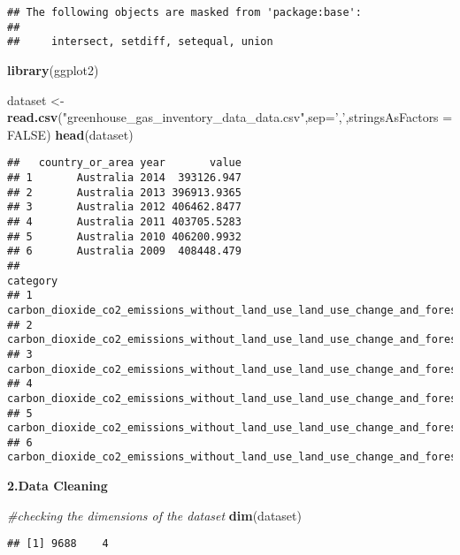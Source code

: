 \documentclass[
]{article}
\newenvironment{Shaded}{\begin{snugshade}}{\end{snugshade}}
\newcommand{\CommentTok}[1]{\textcolor[rgb]{0.56,0.35,0.01}{\textit{#1}}}
\newcommand{\DataTypeTok}[1]{\textcolor[rgb]{0.13,0.29,0.53}{#1}}
\newcommand{\KeywordTok}[1]{\textcolor[rgb]{0.13,0.29,0.53}{\textbf{#1}}}
\newcommand{\NormalTok}[1]{#1}
\newcommand{\OtherTok}[1]{\textcolor[rgb]{0.56,0.35,0.01}{#1}}
\newcommand{\StringTok}[1]{\textcolor[rgb]{0.31,0.60,0.02}{#1}}
\begin{document}
\begin{verbatim}
## The following objects are masked from 'package:base':
## 
##     intersect, setdiff, setequal, union
\end{verbatim}

\begin{Shaded}
\begin{Highlighting}[]
\KeywordTok{library}\NormalTok{(ggplot2)}

\NormalTok{dataset <-}\StringTok{ }\KeywordTok{read.csv}\NormalTok{(}\StringTok{"greenhouse_gas_inventory_data_data.csv"}\NormalTok{,}\DataTypeTok{sep=}\StringTok{','}\NormalTok{,}\DataTypeTok{stringsAsFactors =} \OtherTok{FALSE}\NormalTok{)}
\KeywordTok{head}\NormalTok{(dataset)}
\end{Highlighting}
\end{Shaded}

\begin{verbatim}
##   country_or_area year       value
## 1       Australia 2014  393126.947
## 2       Australia 2013 396913.9365
## 3       Australia 2012 406462.8477
## 4       Australia 2011 403705.5283
## 5       Australia 2010 406200.9932
## 6       Australia 2009  408448.479
##                                                                                                        category
## 1 carbon_dioxide_co2_emissions_without_land_use_land_use_change_and_forestry_lulucf_in_kilotonne_co2_equivalent
## 2 carbon_dioxide_co2_emissions_without_land_use_land_use_change_and_forestry_lulucf_in_kilotonne_co2_equivalent
## 3 carbon_dioxide_co2_emissions_without_land_use_land_use_change_and_forestry_lulucf_in_kilotonne_co2_equivalent
## 4 carbon_dioxide_co2_emissions_without_land_use_land_use_change_and_forestry_lulucf_in_kilotonne_co2_equivalent
## 5 carbon_dioxide_co2_emissions_without_land_use_land_use_change_and_forestry_lulucf_in_kilotonne_co2_equivalent
## 6 carbon_dioxide_co2_emissions_without_land_use_land_use_change_and_forestry_lulucf_in_kilotonne_co2_equivalent
\end{verbatim}

\textbf{2.Data Cleaning}

\begin{Shaded}
\begin{Highlighting}[]
\CommentTok{#checking the dimensions of the dataset}
\KeywordTok{dim}\NormalTok{(dataset)}
\end{Highlighting}
\end{Shaded}

\begin{verbatim}
## [1] 9688    4
\end{verbatim}
\end{document}
